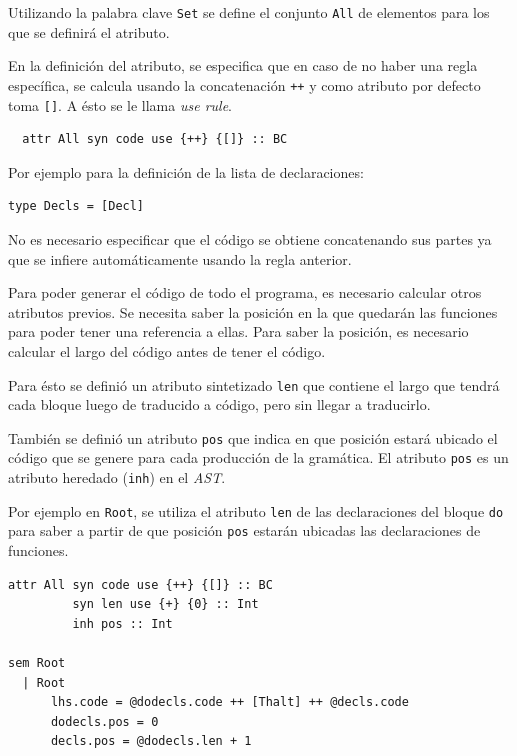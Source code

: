  Utilizando la palabra clave \texttt{Set} se define el conjunto \texttt{All}
de elementos para los que se definirá el atributo.
  
  En la definición del atributo, se especifica que en caso de no haber
una regla específica, se calcula usando la concatenación \texttt{++}
y como atributo por defecto toma \texttt{[]}. A ésto se le llama
\textit{use rule}.

  \begin{Verbatim}
  attr All syn code use {++} {[]} :: BC
  \end{Verbatim}

  Por ejemplo para la definición de la lista de declaraciones:

\begin{Verbatim}
type Decls = [Decl]
\end{Verbatim}

  No es necesario especificar que el código se obtiene concatenando sus
  partes ya que se infiere automáticamente usando la regla anterior.


  Para poder generar el código de todo el programa, es necesario
  calcular otros atributos previos.
  Se necesita saber la posición en la que quedarán las funciones para
  poder tener una referencia a ellas.
  Para saber la posición, es necesario calcular el largo del código
  antes de tener el código.

  Para ésto se definió un atributo sintetizado \texttt{len} que contiene
  el largo que tendrá cada bloque luego de traducido
  a código, pero sin llegar a traducirlo.

  También se definió un atributo \texttt{pos} que indica en que posición
  estará ubicado el código que se genere para cada producción de la
  gramática.
  El atributo \texttt{pos} es un atributo heredado (\texttt{inh}) en
  el \textit{AST}.

  Por ejemplo en \texttt{Root}, se utiliza el atributo \texttt{len} 
  de las declaraciones del bloque \texttt{do} para saber a partir
  de que posición \texttt{pos} estarán ubicadas las declaraciones
  de funciones.

\begin{Verbatim}
attr All syn code use {++} {[]} :: BC
         syn len use {+} {0} :: Int
         inh pos :: Int
 
sem Root
  | Root
      lhs.code = @dodecls.code ++ [Thalt] ++ @decls.code
      dodecls.pos = 0
      decls.pos = @dodecls.len + 1
\end{Verbatim}

